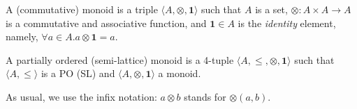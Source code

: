 \documentclass{llncs}
\newcommand{\comment}[1]{}
\def\monid{{\mathbf 0}}
\def\monop{\otimes}
\def\monid{\mathbf{1}}
\begin{document}


%
%

\begin{definition}[monoid]
	A (commutative) monoid is a triple
	$\langle A, \monop, \monid \rangle$ such that $A$ is a set, $\monop: A \times A \rightarrow A$ is
	a commutative and associative function, and $\monid \in A$ is the \emph{identity} element,
	namely, $\forall a \in A. a \monop \monid = a$. %
	
	A partially ordered (semi-lattice) monoid is a 4-tuple
	$\langle A, \leq, \monop, \monid \rangle$ such that 	
	$\langle A, \leq \rangle$ is a PO (SL) and $\langle A, \monop, \monid \rangle$ a monoid.
	
\end{definition}

As usual, we use the infix notation: $a \monop b$ stands for $\monop(a,b)$.
\comment{The monoidal operator can be defined for any multi-set: it is given 
for a family of elements $a_i \in A$ indexed over a finite, non-empty
set $I$, and it is denoted by
$\bigotimes_{i \in I} a_i$.
%
If for an index set $I$ the $a_i$'s are different,
we write $\bigotimes S$ instead of $\bigotimes_{i \in I} a_i$
for the set $S = \{a_i \mid i \in I\}$.
%
Conventionally, we denote $\bigotimes \emptyset = \bot$.}
\end{document}
